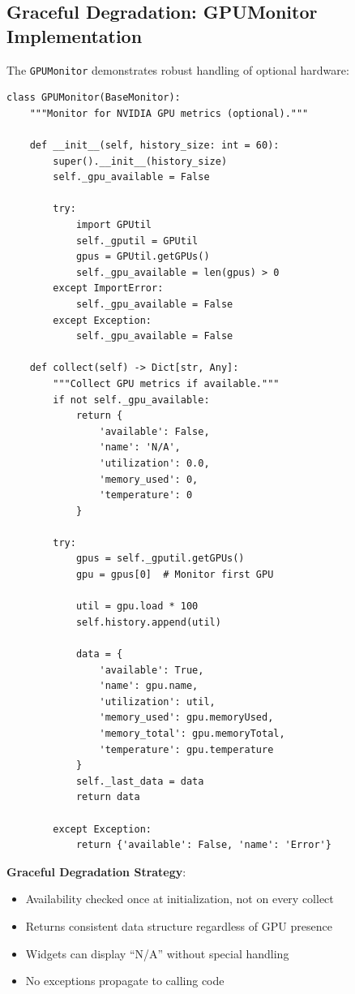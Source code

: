 \documentclass[12pt,a4paper,oneside]{report}
\begin{document}
\subsection{Graceful Degradation: GPUMonitor Implementation}

The \texttt{GPUMonitor} demonstrates robust handling of optional hardware:

\begin{lstlisting}
class GPUMonitor(BaseMonitor):
    """Monitor for NVIDIA GPU metrics (optional)."""
    
    def __init__(self, history_size: int = 60):
        super().__init__(history_size)
        self._gpu_available = False
        
        try:
            import GPUtil
            self._gputil = GPUtil
            gpus = GPUtil.getGPUs()
            self._gpu_available = len(gpus) > 0
        except ImportError:
            self._gpu_available = False
        except Exception:
            self._gpu_available = False
    
    def collect(self) -> Dict[str, Any]:
        """Collect GPU metrics if available."""
        if not self._gpu_available:
            return {
                'available': False,
                'name': 'N/A',
                'utilization': 0.0,
                'memory_used': 0,
                'temperature': 0
            }
        
        try:
            gpus = self._gputil.getGPUs()
            gpu = gpus[0]  # Monitor first GPU
            
            util = gpu.load * 100
            self.history.append(util)
            
            data = {
                'available': True,
                'name': gpu.name,
                'utilization': util,
                'memory_used': gpu.memoryUsed,
                'memory_total': gpu.memoryTotal,
                'temperature': gpu.temperature
            }
            self._last_data = data
            return data
            
        except Exception:
            return {'available': False, 'name': 'Error'}
\end{lstlisting}

\textbf{Graceful Degradation Strategy}:
\begin{itemize}
    \item Availability checked once at initialization, not on every collect
    \item Returns consistent data structure regardless of GPU presence
    \item Widgets can display ``N/A'' without special handling
    \item No exceptions propagate to calling code
\end{itemize}
\end{document}
